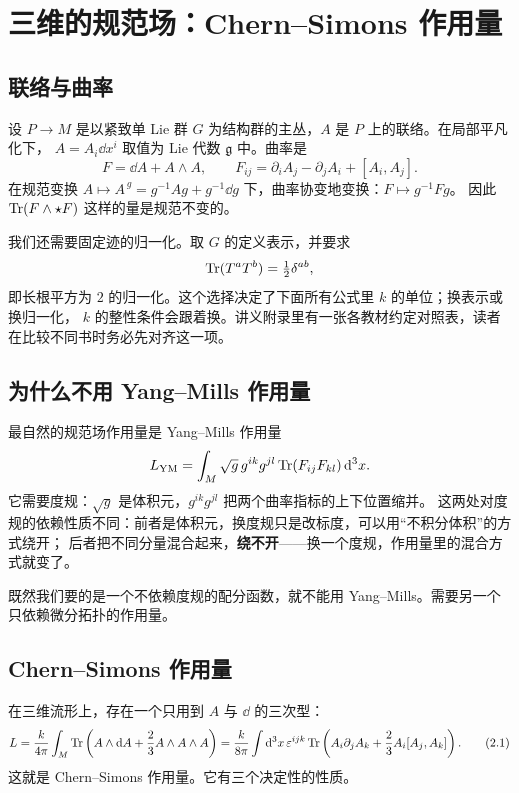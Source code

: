 \section{三维的规范场：Chern--Simons 作用量}

\subsection{联络与曲率}

设 $P\to M$ 是以紧致单 Lie 群 $G$ 为结构群的主丛，$A$ 是 $P$ 上的联络。在局部平凡化下，
$A=A_i\dd x^i$ 取值为 Lie 代数 $\mathfrak g$ 中。曲率是
\[
F=\dd A+A\wedge A,\qquad F_{ij}=\partial_iA_j-\partial_jA_i+[A_i,A_j].
\]
在规范变换 $A\mapsto A^{\,g}=g^{-1}Ag+g^{-1}\dd g$ 下，曲率协变地变换：$F\mapsto g^{-1}Fg$。
因此 $\operatorname{Tr}(F\wedge\star F)$ 这样的量是规范不变的。

我们还需要固定迹的归一化。取 $G$ 的定义表示，并要求
\[
\operatorname{Tr}(T^aT^b)=\tfrac12\delta^{ab},
\]
即长根平方为 $2$ 的归一化。这个选择决定了下面所有公式里 $k$ 的单位；换表示或换归一化，
$k$ 的整性条件会跟着换。讲义附录里有一张各教材约定对照表，读者在比较不同书时务必先对齐这一项。

\subsection{为什么不用 Yang--Mills 作用量}

最自然的规范场作用量是 Yang--Mills 作用量
\[
L_{\mathrm{YM}}=\int_M\sqrt g\,g^{ik}g^{jl}\operatorname{Tr}(F_{ij}F_{kl})\,\mathrm{d}^3x.
\]
它需要度规：$\sqrt g$ 是体积元，$g^{ik}g^{jl}$ 把两个曲率指标的上下位置缩并。
这两处对度规的依赖性质不同：前者是体积元，换度规只是改标度，可以用“不积分体积”的方式绕开；
后者把不同分量混合起来，\textbf{绕不开}——换一个度规，作用量里的混合方式就变了。

既然我们要的是一个不依赖度规的配分函数，就不能用 Yang--Mills。需要另一个只依赖微分拓扑的作用量。

\subsection{Chern--Simons 作用量}

在三维流形上，存在一个只用到 $A$ 与 $\dd$ 的三次型：
\begin{equation}
L=\frac{k}{4\pi}\int_M\operatorname{Tr}\left(A\wedge\mathrm{d} A+\frac23A\wedge A\wedge A\right)
=\frac{k}{8\pi}\int\mathrm{d}^3x\,\varepsilon^{ijk}\operatorname{Tr}\left(A_i\partial_jA_k+\frac23A_i[A_j,A_k]\right). \tag{2.1}
\end{equation}
这就是 Chern--Simons 作用量。它有三个决定性的性质。

